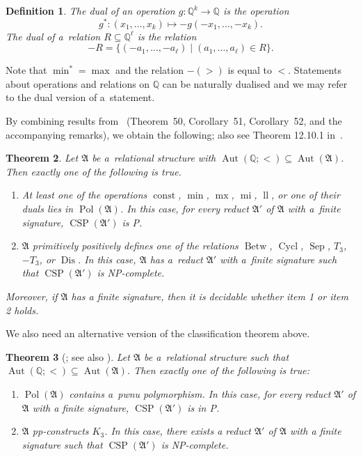 \documentclass[preprint,12pt]{elsarticle}
\newcommand{\Q}{\mathbb Q}
\newcommand{\bA}{{\mathfrak A}}
\DeclareMathOperator{\Cyc}{Cycl}
\DeclareMathOperator{\Aut}{Aut}
\DeclareMathOperator{\CSP}{CSP}
\DeclareMathOperator{\Pol}{Pol}
\DeclareMathOperator{\mi}{mi}
\DeclareMathOperator{\lele}{ll}
\DeclareMathOperator{\mx}{mx}
\DeclareMathOperator{\lex}{lex}
\DeclareMathOperator{\const}{const}
\DeclareMathOperator{\Betw}{Betw}
\DeclareMathOperator{\Sep}{Sep}
\DeclareMathOperator{\Dis}{Dis}
\newtheorem{theorem}{Theorem}
\newtheorem{definition}[theorem]{Definition}
\begin{document}
\begin{definition}
The \emph{dual} of an operation $g \colon {\mathbb Q}^k \to {\mathbb Q}$ is the operation $$g^* \colon (x_1,\dots,x_k) \mapsto -g(-x_1,\dots,-x_k).$$
The \emph{dual} of a~relation $R \subseteq \Q^\ell$ is the relation
$$-R=\{(-a_1, \dots, -a_\ell) \mid (a_1, \dots, a_\ell) \in R \}.$$
\end{definition}
Note that $\min^*=\max$ and the relation $-(>)$ is equal to $<$. 
Statements about operations and relations on $\Q$ can be naturally dualised and we may refer to the dual version of a~statement.
%
%



By combining results from~\cite{tcsps-journal}
(Theorem~50, Corollary~51, Corollary~52, and the accompanying remarks), 
we obtain the following; also see Theorem 12.10.1 in~\cite{Book}. 
\begin{theorem} \label{thm:tcsp}
Let $\bA$ be a~relational structure with $\Aut(\Q; <)\subseteq \Aut(\bA)$. Then exactly one of the following is true.
\begin{enumerate}
    \item At least one of the operations $\const$, $\min$, $\mx$, $\mi$, $\lele$, or one of their duals lies in $\Pol(\bA)$. In this case, for every reduct $\bA'$ of $\bA$ with a~finite signature, $\CSP(\bA')$ is P. 
    \item $\bA$ primitively positively defines one of the relations $\Betw$, $\Cyc$, $\Sep$, $T_3$, $-T_3$, or $\Dis$. In this case, $\bA$ has a~reduct $\bA'$ with a~finite signature such that $\CSP(\bA')$ is NP-complete.
\end{enumerate}
Moreover, if $\bA$ has a finite signature, then it is decidable whether item 1 or item 2 holds.
\end{theorem}

We also need an alternative version of the classification theorem above. 

\begingroup
\setlength{\emergencystretch}{1em} %
\begin{theorem}[{{\cite[Theorem 12.0.1]{Book}}; see also {\cite[Theorem 7.24]{RydvalDescr}}}]
\label{thm:tcsp-pwnu}
Let $\bA$ be a~relational structure such that $\Aut(\Q;<) \subseteq \Aut(\bA)$. Then exactly one of the following is true:
\begin{enumerate}
\item $\Pol(\bA)$ contains a~pwnu polymorphism. In this case, for every reduct $\bA'$ of $\bA$ with a finite signature, $\CSP(\bA')$ is in P.
\item $\bA$
pp-constructs $K_3$. In this case, there exists a reduct $\bA'$ of $\bA$ with a finite signature such that $\CSP(\bA')$ is NP-complete.
\end{enumerate}
\end{theorem}
\endgroup
\end{document}
